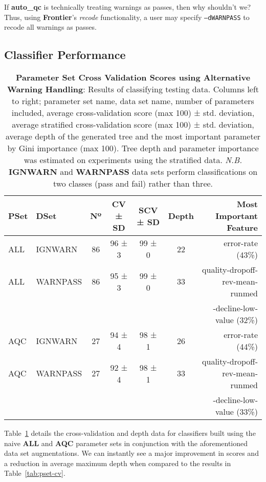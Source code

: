 If \textbf{auto\_qc} is technically treating warnings as passes, then why
shouldn't we? Thus, using \textbf{Frontier}'s \textit{recode} functionality, a
user may specify \texttt{--dWARNPASS} to recode all
warnings as passes.


\subsection{Classifier Performance}
\begin{table}[H]
    \centering
    \begin{tabular}{l l | c  c  c  c  r}
        PSet & DSet          & Nº & CV ± SD & SCV ± SD & Depth & Most Important Feature\\
        \hline
        ALL & IGNWARN    & 86 & 96 ± 3 & 99 ± 0 & 22 & error-rate (43\%)\\
        ALL & WARNPASS   & 86 & 95 ± 3 & 99 ± 0 & 33 & quality-dropoff-rev-mean-runmed\\
                                                       &&&&&&-decline-low-value (32\%)\\
        AQC & IGNWARN    & 27 & 94 ± 4 & 98 ± 1 & 26 & error-rate (44\%)\\
        AQC & WARNPASS   & 27 & 92 ± 4 & 98 ± 1 & 33 & quality-dropoff-rev-mean-runmed\\
                                                       &&&&&&-decline-low-value (33\%)\\
    \end{tabular}

    \caption[all-pset-cv]{\textbf{Parameter Set Cross Validation Scores using
        Alternative Warning Handling}:
        Results of classifying testing data.
        Columns left to right; parameter set name, data set name, number of parameters
        included, average cross-validation score (max 100) ± std. deviation,
        average stratified cross-validation score (max 100) ± std. deviation,
        average depth of the generated tree and the most important parameter by
        Gini importance (max 100). Tree depth and parameter importance was
        estimated on experiments using the stratified data. \textit{N.B.}
        \textbf{IGNWARN} and \textbf{WARNPASS} data sets perform classifications on
        two classes (pass and fail) rather than three.}
    \label{tab:all-pset-cv}
\end{table}

Table~\ref{tab:all-pset-cv} details the cross-validation and depth data for
classifiers built using the naive \textbf{ALL} and \textbf{AQC}
parameter sets in conjunction with the aforementioned data set augmentations.
We can instantly see a major improvement in scores and a reduction in average
maximum depth when compared to the results in Table~\ref{tab:pset-cv}.

